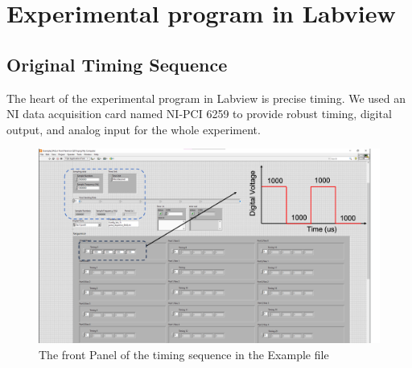 \documentclass{article}
\begin{document}
\section{Experimental program in Labview}
\subsection{Original Timing Sequence}
The heart of the experimental program in Labview is precise timing. We used an NI data acquisition card named NI-PCI 6259 to provide robust timing, digital output, and analog input for the whole experiment. 
\begin{figure}[htbp]
    \centering
    \includegraphics[width=1\linewidth]{fig/Timing.png}
    \caption{The front Panel of the timing sequence in the Example file}
    \label{fig:timing}
\end{figure}
\end{document}
